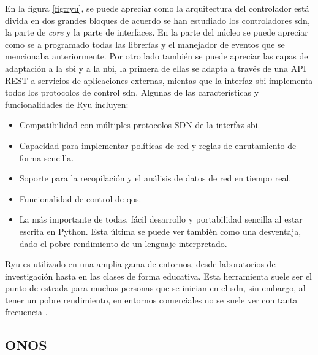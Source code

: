En la figura \ref*{fig:ryu}, se puede apreciar como la arquitectura del controlador está divida en dos grandes bloques de acuerdo se han estudiado los controladores \gls{sdn}, la parte de \textit{core} y la parte de interfaces. En la parte del núcleo se puede apreciar como se a programado todas las librerías y el manejador de eventos que se mencionaba anteriormente. Por otro lado también se puede apreciar las capas de adaptación a la \gls{sbi} y a la \gls{nbi}, la primera de ellas se adapta a través de una API REST a servicios de aplicaciones externas, mientas que la interfaz \gls{sbi} implementa todos los protocolos de control \gls{sdn}. Algunas de las características y funcionalidades de Ryu incluyen:

\begin{itemize}
    \item Compatibilidad con múltiples protocolos SDN de la interfaz \gls{sbi}.
    \item Capacidad para implementar políticas de red y reglas de enrutamiento de forma sencilla.
    \item Soporte para la recopilación y el análisis de datos de red en tiempo real.
    \item Funcionalidad de control de \gls{qos}.
    \item La más importante de todas, fácil desarrollo y portabilidad sencilla al estar escrita en Python. Esta última se puede ver también como una desventaja, dado el pobre rendimiento de un lenguaje interpretado.
\end{itemize}

Ryu es utilizado en una amplia gama de entornos, desde laboratorios de investigación hasta en las clases de forma educativa. Esta herramienta suele ser el punto de estrada para muchas personas que se inician en el \gls{sdn}, sin embargo, al tener un pobre rendimiento, en entornos comerciales no se suele ver con tanta frecuencia \cite{tomonori2013introduction}.

\subsection{ONOS}
\label{subsec:ONOS}